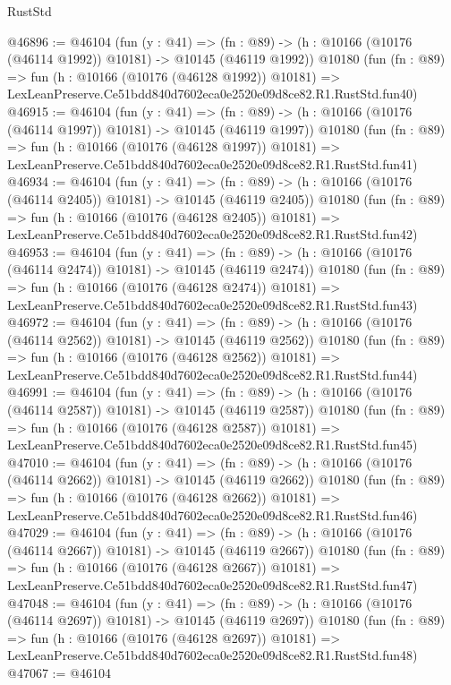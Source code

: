 \begin{lexlean}{RustStd}
\begin{coremodule}
@46896 := @46104
    (fun (y : @41) =>
    (fn : @89) -> (h : @10166 (@10176 (@46114 @1992)) @10181) -> @10145 (@46119 @1992))
    @10180
    (fun (fn : @89) =>
    fun (h : @10166 (@10176 (@46128 @1992)) @10181) =>
    LexLeanPreserve.Ce51bdd840d7602eca0e2520e09d8ce82.R1.RustStd.fun40)
@46915 := @46104
    (fun (y : @41) =>
    (fn : @89) -> (h : @10166 (@10176 (@46114 @1997)) @10181) -> @10145 (@46119 @1997))
    @10180
    (fun (fn : @89) =>
    fun (h : @10166 (@10176 (@46128 @1997)) @10181) =>
    LexLeanPreserve.Ce51bdd840d7602eca0e2520e09d8ce82.R1.RustStd.fun41)
@46934 := @46104
    (fun (y : @41) =>
    (fn : @89) -> (h : @10166 (@10176 (@46114 @2405)) @10181) -> @10145 (@46119 @2405))
    @10180
    (fun (fn : @89) =>
    fun (h : @10166 (@10176 (@46128 @2405)) @10181) =>
    LexLeanPreserve.Ce51bdd840d7602eca0e2520e09d8ce82.R1.RustStd.fun42)
@46953 := @46104
    (fun (y : @41) =>
    (fn : @89) -> (h : @10166 (@10176 (@46114 @2474)) @10181) -> @10145 (@46119 @2474))
    @10180
    (fun (fn : @89) =>
    fun (h : @10166 (@10176 (@46128 @2474)) @10181) =>
    LexLeanPreserve.Ce51bdd840d7602eca0e2520e09d8ce82.R1.RustStd.fun43)
@46972 := @46104
    (fun (y : @41) =>
    (fn : @89) -> (h : @10166 (@10176 (@46114 @2562)) @10181) -> @10145 (@46119 @2562))
    @10180
    (fun (fn : @89) =>
    fun (h : @10166 (@10176 (@46128 @2562)) @10181) =>
    LexLeanPreserve.Ce51bdd840d7602eca0e2520e09d8ce82.R1.RustStd.fun44)
@46991 := @46104
    (fun (y : @41) =>
    (fn : @89) -> (h : @10166 (@10176 (@46114 @2587)) @10181) -> @10145 (@46119 @2587))
    @10180
    (fun (fn : @89) =>
    fun (h : @10166 (@10176 (@46128 @2587)) @10181) =>
    LexLeanPreserve.Ce51bdd840d7602eca0e2520e09d8ce82.R1.RustStd.fun45)
@47010 := @46104
    (fun (y : @41) =>
    (fn : @89) -> (h : @10166 (@10176 (@46114 @2662)) @10181) -> @10145 (@46119 @2662))
    @10180
    (fun (fn : @89) =>
    fun (h : @10166 (@10176 (@46128 @2662)) @10181) =>
    LexLeanPreserve.Ce51bdd840d7602eca0e2520e09d8ce82.R1.RustStd.fun46)
@47029 := @46104
    (fun (y : @41) =>
    (fn : @89) -> (h : @10166 (@10176 (@46114 @2667)) @10181) -> @10145 (@46119 @2667))
    @10180
    (fun (fn : @89) =>
    fun (h : @10166 (@10176 (@46128 @2667)) @10181) =>
    LexLeanPreserve.Ce51bdd840d7602eca0e2520e09d8ce82.R1.RustStd.fun47)
@47048 := @46104
    (fun (y : @41) =>
    (fn : @89) -> (h : @10166 (@10176 (@46114 @2697)) @10181) -> @10145 (@46119 @2697))
    @10180
    (fun (fn : @89) =>
    fun (h : @10166 (@10176 (@46128 @2697)) @10181) =>
    LexLeanPreserve.Ce51bdd840d7602eca0e2520e09d8ce82.R1.RustStd.fun48)
@47067 := @46104

\end{coremodule}
\end{lexlean}
